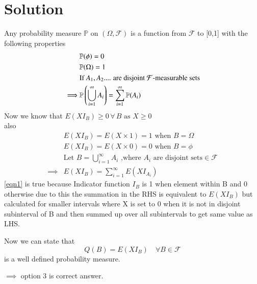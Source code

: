 \documentclass[journal,12pt,twocolumn]{IEEEtran}
\begin{document}
\section{Solution}
Any probability measure \(\mathbb{P}\) on \((\Omega,\mathcal{F})\) is a function from \(\mathcal{F}\) to [0,1] with the following properties
\begin{align}
    & \mathbb{P}(\phi)=0\\
    & \mathbb{P}(\Omega)=1\\ \nonumber
    &\text{If \(A_1,A_2\).... are disjoint \(\mathcal{F}\)-measurable sets}\\
    \implies & \mathbb{P}\left(\bigcup_{i=1}^{\infty} A_i\right)= \sum_{i=1}^{\infty} \mathbb{P}(A_i)
\end{align}
Now we know that \(E(XI_B)\geq 0\, \forall\, B\text{ as } X\geq 0\)\\
also 
\begin{align}
& E(XI_B)=E(X\times 1)=1  \text{ when } B=\Omega\\
& E(XI_B)=E(X\times0)=0  \text{ when } B=\phi\\ \nonumber
& \text{Let } B=\bigcup_{i=1}^{\infty} A_i \text{ ,where } A_i\text{ are disjoint sets}\in \mathcal{F}\\
\implies & E(XI_B)=\sum_{i=1}^{\infty} E(XI_{A_i}) \label{eqn1}
\end{align}
\eqref{eqn1} is true because Indicator function \(I_B\) is 1 when element within B and 0 otherwise due to this the summation in the RHS is equivalent to \( E(XI_B)\) but calculated for smaller intervals where X is set to 0 when it is not in disjoint subinterval of B and then summed up over all subintervals to get same value as LHS.

Now we can state that \[Q(B)=E(XI_B)\quad\forall B \in \mathcal{F}\] is a well defined probability measure.

\(\implies\) option 3 is correct answer.
\end{document}
